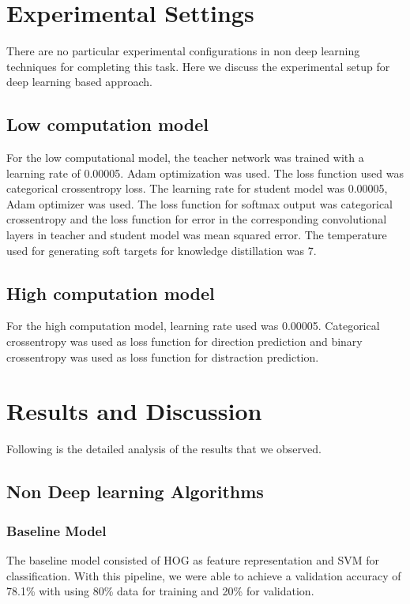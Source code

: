 \documentclass[extendedabs]{bmvc2k}
\begin{document}
\section{Experimental Settings}
There are no particular experimental configurations in non deep learning techniques for completing this task. Here we discuss the experimental setup for deep learning based approach.



\subsection{Low computation model}
For the low computational model, the teacher network was trained with a learning rate of 0.00005. Adam optimization \cite{kingma2014adam} was used. The loss function used was categorical crossentropy loss. The learning rate for student model was 0.00005, Adam optimizer was used. The loss function for softmax output was categorical crossentropy and the loss function for error in the corresponding convolutional layers in teacher and student model was mean squared error. The temperature used for generating soft targets for knowledge distillation was 7.

\subsection{High computation model}
For the high computation model, learning rate used was 0.00005. Categorical crossentropy was used as loss function for direction prediction and binary crossentropy was used as loss function for distraction prediction.

\section{Results and Discussion}
Following is the detailed analysis of the results that we observed.

\subsection{Non Deep learning Algorithms}
\subsubsection{Baseline Model}
The baseline model consisted of HOG as feature representation and SVM for classification. With this pipeline, we were able to achieve a validation accuracy of 78.1\% with using 80\% data for training and 20\% for validation.
\end{document}
